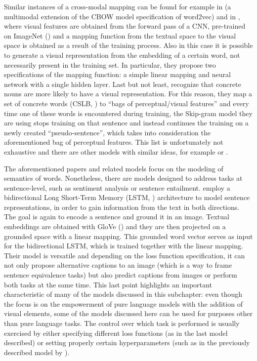 \documentclass[
]{krantz}
\begin{document}
Similar instances of a cross-modal mapping can be found for example in \citet{kottur2016visual} (a multimodal extension of the CBOW model specification of word2vec) and in \citet{collell2017imagined}, where visual features are obtained from the forward pass of a CNN, pre-trained on ImageNet (\citet{deng2009imagenet}) and a mapping function from the textual space to the visual space is obtained as a result of the training process. Also in this case it is possible to generate a visual representation from the embedding of a certain word, not necessarily present in the training set. In particular, they propose two specifications of the mapping function: a simple linear mapping and neural network with a single hidden layer. Last but not least, \citet{hill2014learning} recognize that concrete nouns are more likely to have a visual representation. For this reason, they map a set of concrete words (CSLB, \citet{devereux2014centre}) to ``bags of perceptual/visual features'' and every time one of these words is encountered during training, the Skip-gram model they are using stops training on that sentence and instead continues the training on a newly created ``pseudo-sentence'', which takes into consideration the aforementioned bag of perceptual features. This list is unfortunately not exhaustive and there are other models with similar ideas, for example \citet{ailem2018probabilistic} or \citet{kiros2018illustrative}.

The aforementioned papers and related models focus on the modeling of semantics of words. Nonetheless, there are models designed to address tasks at sentence-level, such as sentiment analysis or sentence entailment. \citet{kiela2017learning} employ a bidirectional Long Short-Term Memory (LSTM, \citet{hochreiter1997long}) architecture to model sentence representations, in order to gain information from the text in both directions. The goal is again to encode a sentence and ground it in an image. Textual embeddings are obtained with GloVe (\citet{pennington2014glove}) and they are then projected on a grounded space with a linear mapping. This grounded word vector serves as input for the bidirectional LSTM, which is trained together with the linear mapping. Their model is versatile and depending on the loss function specification, it can not only propose alternative captions to an image (which is a way to frame sentence equivalence tasks) but also predict captions from images or perform both tasks at the same time. This last point highlights an important characteristic of many of the models discussed in this subchapter: even though the focus is on the empowerment of pure language models with the addition of visual elements, some of the models discussed here can be used for purposes other than pure language tasks. The control over which task is performed is usually exercised by either specifying different loss functions (as in the last model described) or setting properly certain hyperparameters (such as in the previously described model by \citet{silberer2014learning}).\\
\end{document}
